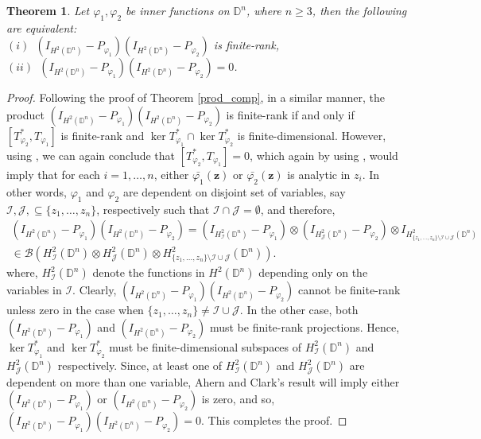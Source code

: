 \documentclass[12pt, a4 paper]{amsart}
\newcommand{\clb}{\mathcal{B}}
\newcommand{\D}{\mathbb{D}}
\theoremstyle{definition}
\theoremstyle{plain}
\newtheorem{thm}{Theorem}[section]
\theoremstyle{definition}
\numberwithin{equation}{section}
\let\phi=\varphi
\begin{document}
\begin{thm}\label{compact-proj2}
Let $\phi_1, \phi_2$ be inner functions on $\D^n$, where $n \geq 3$, then the following are equivalent:\\ \vspace{1mm}
$(i)$~$(I_{H^2(\D^n)}  - P_{\phi_1})(I_{H^2(\D^n)}  - P_{\phi_2})$ is finite-rank,\\ \vspace{1mm}
$(ii)$~$(I_{H^2(\D^n)}  - P_{\phi_1})(I_{H^2(\D^n)}  - P_{\phi_2})= 0$.
\end{thm}
\begin{proof}
Following the proof of Theorem \ref{prod_comp}, in a similar manner, the product $(I_{H^2(\D^n)} - P_{\phi_1})(I_{H^2(\D^n)}  - P_{\phi_2})$ is finite-rank if and only if $[T_{\phi_2}^*, T_{\phi_1}]$ is finite-rank and $\ker T_{\phi_1}^* \cap \ker T_{\phi_2}^*$ is finite-dimensional. However, using \cite[Corollary 1]{Gu}, we can again conclude that $[T_{\phi_2}^*, T_{\phi_1}] = 0$, which again by using \cite[Corollary 2]{Gu}, would imply that for each $i=1,\ldots,n$, either $\bar{\phi_1}(\bm{z})$ or $\bar{\phi_2}(\bm{z})$ is analytic in $z_i$. In other words, $\phi_1$ and $\phi_2$ are dependent on disjoint set of variables, say $\mathcal{I}, \mathcal{J}, \subseteq \{z_1, \ldots,z_n\}$, respectively such that $\mathcal{I} \cap \mathcal{J} = \emptyset$, and therefore,
\[
\begin{split}
(I_{H^2(\D^n)} - P_{\phi_1})(I_{H^2(\D^n)} - P_{\phi_2}) = (I_{H_{\mathcal{I}}^2(\D^n)}- P_{\phi_1}) \otimes (I_{H_{\mathcal{J}}^2(\D^n)} - P_{\phi_2}) \otimes I_{H_{\{z_1,\ldots,z_n\} \setminus \mathcal{I} \cup \mathcal{J}}^2(\D^n)} \\
 \in \clb(H_{\mathcal{I}}^2(\D^n) \otimes H_{\mathcal{J}}^2(\D^n) \otimes H_{\{z_1,\ldots,z_n\} \setminus \mathcal{I} \cup \mathcal{J}}^2(\D^n)).
\end{split}
\]
where, $H_{\mathcal{I}}^2(\D^n)$ denote the functions in $H^2(\D^n)$ depending only on the variables in $\mathcal{I}$. Clearly, $(I_{H^2(\D^n)}  - P_{\phi_1})(I_{H^2(\D^n)}  - P_{\phi_2}) $ cannot be finite-rank unless zero in the case when $\{z_1, \ldots,z_n\} \neq \mathcal{I} \cup \mathcal{J}$. In the other case, both $(I_{H^2(\D^n)}  - P_{\phi_1})$ and $(I _{H^2(\D^n)} - P_{\phi_2})$ must be finite-rank projections. Hence, $\ker T_{\phi_1}^*$ and $\ker T_{\phi_2}^*$ must be finite-dimensional subspaces of $H_{\mathcal{I}}^2(\D^n)$ and $H_{\mathcal{J}}^2(\D^n)$ respectively. Since, at least one of $H_{\mathcal{I}}^2(\D^n)$ and $H_{\mathcal{J}}^2(\D^n)$ are dependent on more than one variable, Ahern and Clark's result will imply either $(I _{H^2(\D^n)} - P_{\phi_1})$ or $(I _{H^2(\D^n)} - P_{\phi_2})$ is zero, and so, $
(I_{H^2(\D^n)}  - P_{\phi_1})(I_{H^2(\D^n)}  - P_{\phi_2}) =0.
$
This completes the proof.
\end{proof}
 
\end{document}

